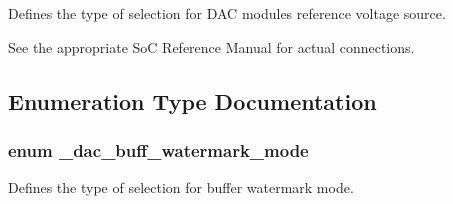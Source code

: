 Defines the type of selection for D\+AC module\textquotesingle{}s reference voltage source. 

See the appropriate SoC Reference Manual for actual connections. 

\subsection{Enumeration Type Documentation}
\subsubsection[{\texorpdfstring{\+\_\+dac\+\_\+buff\+\_\+watermark\+\_\+mode}{_dac_buff_watermark_mode}}]{\setlength{\rightskip}{0pt plus 5cm}enum {\bf \+\_\+dac\+\_\+buff\+\_\+watermark\+\_\+mode}}\hypertarget{group__dac__hal_gaca326abf4ffaa1ea20eb364e519361a0}{}\label{group__dac__hal_gaca326abf4ffaa1ea20eb364e519361a0}


Defines the type of selection for buffer watermark mode. 

